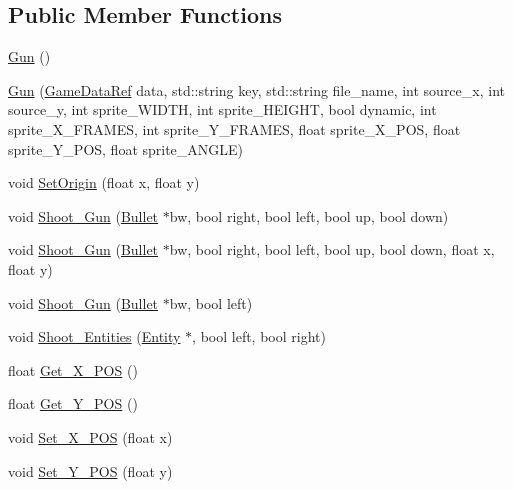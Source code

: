 \subsection*{Public Member Functions}
\begin{DoxyCompactItemize}
\item 
\hyperlink{classSekander_1_1Gun_a576c17046ba8d7bfca10333695668302}{Gun} ()
\item 
\hyperlink{classSekander_1_1Gun_a0027f58d8ff9eb4b97bd48c5af3aa3f0}{Gun} (\hyperlink{namespaceSekander_a1d69b002ba2d23020901c28f0def5e16}{Game\+Data\+Ref} data, std\+::string key, std\+::string file\+\_\+name, int source\+\_\+x, int source\+\_\+y, int sprite\+\_\+\+W\+I\+D\+TH, int sprite\+\_\+\+H\+E\+I\+G\+HT, bool dynamic, int sprite\+\_\+\+X\+\_\+\+F\+R\+A\+M\+ES, int sprite\+\_\+\+Y\+\_\+\+F\+R\+A\+M\+ES, float sprite\+\_\+\+X\+\_\+\+P\+OS, float sprite\+\_\+\+Y\+\_\+\+P\+OS, float sprite\+\_\+\+A\+N\+G\+LE)
\item 
void \hyperlink{classSekander_1_1Gun_aced0361bd919bc1221e55d06e8293a88}{Set\+Origin} (float x, float y)
\item 
void \hyperlink{classSekander_1_1Gun_a748d795cb18ae0fe6ecc6cb4f5841273}{Shoot\+\_\+\+Gun} (\hyperlink{classSekander_1_1Bullet}{Bullet} $\ast$bw, bool right, bool left, bool up, bool down)
\item 
void \hyperlink{classSekander_1_1Gun_a82e57bc14df7f3a92721c79a761435f6}{Shoot\+\_\+\+Gun} (\hyperlink{classSekander_1_1Bullet}{Bullet} $\ast$bw, bool right, bool left, bool up, bool down, float x, float y)
\item 
void \hyperlink{classSekander_1_1Gun_aad6f4af76435694e0115bb1d702707bd}{Shoot\+\_\+\+Gun} (\hyperlink{classSekander_1_1Bullet}{Bullet} $\ast$bw, bool left)
\item 
void \hyperlink{classSekander_1_1Gun_a3410d2e3352ec9cb6deb21deda8ff160}{Shoot\+\_\+\+Entities} (\hyperlink{classSekander_1_1Entity}{Entity} $\ast$, bool left, bool right)
\item 
float \hyperlink{classSekander_1_1Gun_afe5f1919f2c56d662b7229dc1fe80d03}{Get\+\_\+\+X\+\_\+\+P\+OS} ()
\item 
float \hyperlink{classSekander_1_1Gun_a30d3329bf0e9ad440e999395d8a928ef}{Get\+\_\+\+Y\+\_\+\+P\+OS} ()
\item 
void \hyperlink{classSekander_1_1Gun_aa6f3101db896d88eb05d0c334b59507d}{Set\+\_\+\+X\+\_\+\+P\+OS} (float x)
\item 
void \hyperlink{classSekander_1_1Gun_a5bb1f6897ec05506c0076e4b39e6ebed}{Set\+\_\+\+Y\+\_\+\+P\+OS} (float y)

\end{DoxyCompactItemize}
